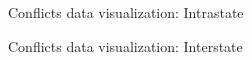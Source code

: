 \documentclass[notes,11pt, aspectratio=169]{beamer}
\begin{document}
\begin{frame}{Conflicts data visualization: Intrastate}
\begin{figure}
	\centering
\end{figure}	
\end{frame}

\begin{frame}{Conflicts data visualization: Interstate}
	
\begin{figure}
	\centering
\end{figure}	
\end{frame}
\end{document}
